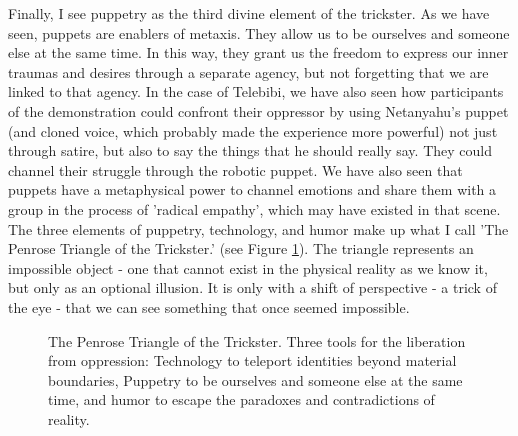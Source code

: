 \documentclass[dissertation,math,vertlayout,pdfa,colorlinks,nologo]{aaltoseries}
\begin{document}
Finally, I see puppetry as the third divine element of the trickster. As we have seen, puppets are enablers of metaxis. They allow us to be ourselves and someone else at the same time. In this way, they grant us the freedom to express our inner traumas and desires through a separate agency, but not forgetting that we are linked to that agency. In the case of Telebibi, we have also seen how participants of the demonstration could confront their oppressor by using Netanyahu's puppet (and cloned voice, which probably made the experience more powerful) not just through satire, but also to say the things that he should really say. They could channel their struggle through the robotic puppet. We have also seen that puppets have a metaphysical power to channel emotions and share them with a group in the process of 'radical empathy', which may have existed in that scene. The three elements of puppetry, technology, and humor make up what I call 'The Penrose Triangle of the Trickster.' (see Figure \ref{fig:penrose-trickster}). The triangle represents an impossible object \cite{penroseImpossibleObjectsSpecial1958} - one that cannot exist in the physical reality as we know it, but only as an optional illusion. It is only with a shift of perspective - a trick of the eye -  that we can see something that once seemed impossible.

\begin{figure}
    \centering
    
    \caption{The Penrose Triangle of the Trickster. Three tools for the liberation from oppression: Technology to teleport identities beyond material boundaries, Puppetry to be ourselves and someone else at the same time, and humor to escape the paradoxes and contradictions of reality.}
    \label{fig:penrose-trickster}
\end{figure}

\pagebreak


\end{document}
